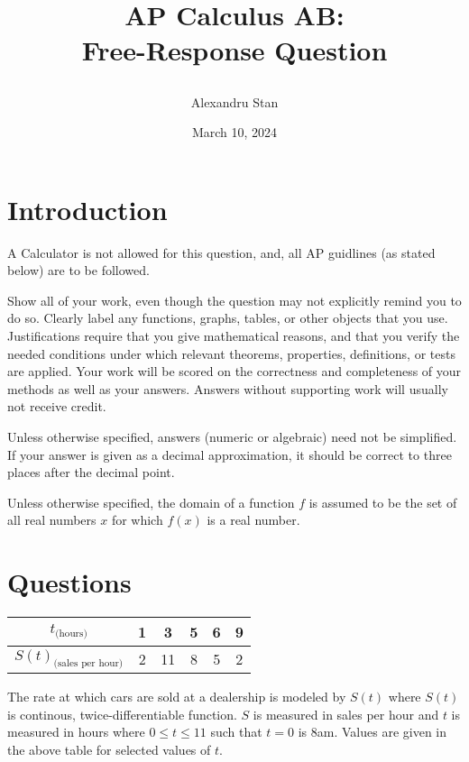 \documentclass{article}
\title{
    \textbf{AP Calculus AB: \\Free-Response Question}
    \author{Alexandru Stan}
    \date{March 10, 2024}
}
\begin{document}
    \maketitle
    \vfill
    \newpage

    \section*{Introduction}

    A Calculator is not allowed for this question, and, all AP guidlines (as stated below) 
    are to be followed. 

    Show all of your work, even though the question may not explicitly remind you to do so. Clearly label any
    functions, graphs, tables, or other objects that you use. Justifications require that you give mathematical reasons,
    and that you verify the needed conditions under which relevant theorems, properties, definitions, or tests are
    applied. Your work will be scored on the correctness and completeness of your methods as well as your answers.
    Answers without supporting work will usually not receive credit.

    Unless otherwise specified, answers (numeric or algebraic) need not be simplified. If your answer is given as a
    decimal approximation, it should be correct to three places after the decimal point.

    Unless otherwise specified, the domain of a function $f$ is assumed to be the set of all real numbers $x$ for which
    $f(x)$ is a real number.

    \section*{Questions}

    \begin{table}[h]
        \def\arraystretch{2}
        \begin{tabular}{|c|c|c|c|c|c|}
            \hline
            $t_{\text{(hours)}}$ & 1 & 3 & 5 & 6 & 9 \\
            \hline
            $S(t)_{\text{(sales per hour)}}$ & 2 & 11 & 8 & 5 & 2 \\
            \hline 
        \end{tabular}
    \end{table} 

    The rate at which cars are sold at a dealership is modeled by $S(t)$ where $S(t)$ is continous, twice-differentiable function.
    $S$ is measured in sales per hour and $t$ is measured in hours where $0 \le t \le 11$ such that
    $t = 0$ is 8am. Values are given in the above table for selected values of $t$.
\end{document}
